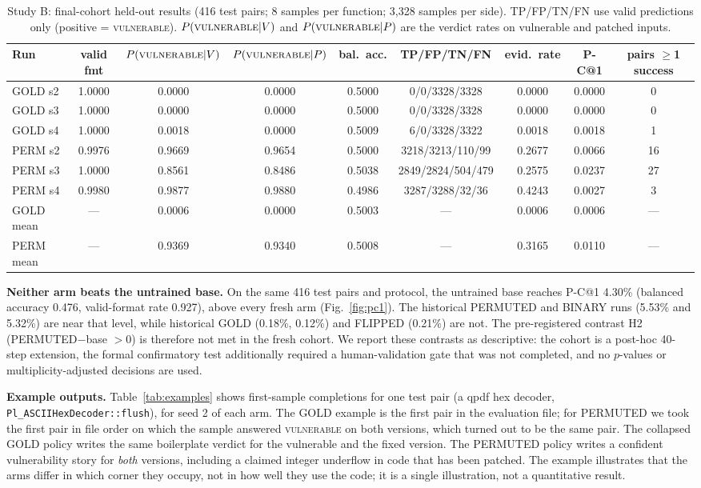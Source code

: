 \documentclass[journal]{IEEEtran}
\makeatletter
\newcommand{\vuln}{\textsc{vulnerable}}
\newcommand{\pc}{P-C@1}
\makeatother
\begin{document}
\begin{table}[t]
\centering\footnotesize\setlength{\tabcolsep}{4pt}
\caption{Study B: final-cohort held-out results (416 test pairs; 8 samples per function; 3,328 samples per side). TP/FP/TN/FN use valid predictions only (positive = \vuln{}). $P(\vuln|V)$ and $P(\vuln|P)$ are the verdict rates on vulnerable and patched inputs.}
\label{tab:cohort}
\begin{tabular}{lcccccccc}
\toprule
Run & valid fmt & $P(\vuln|V)$ & $P(\vuln|P)$ & bal.\ acc. & TP/FP/TN/FN & evid.\ rate & \pc{} & pairs $\ge$1 success\\
\midrule
GOLD s2 & 1.0000 & 0.0000 & 0.0000 & 0.5000 & 0/0/3328/3328 & 0.0000 & 0.0000 & 0\\
GOLD s3 & 1.0000 & 0.0000 & 0.0000 & 0.5000 & 0/0/3328/3328 & 0.0000 & 0.0000 & 0\\
GOLD s4 & 1.0000 & 0.0018 & 0.0000 & 0.5009 & 6/0/3328/3322 & 0.0018 & 0.0018 & 1\\
PERM s2 & 0.9976 & 0.9669 & 0.9654 & 0.5000 & 3218/3213/110/99 & 0.2677 & 0.0066 & 16\\
PERM s3 & 1.0000 & 0.8561 & 0.8486 & 0.5038 & 2849/2824/504/479 & 0.2575 & 0.0237 & 27\\
PERM s4 & 0.9980 & 0.9877 & 0.9880 & 0.4986 & 3287/3288/32/36 & 0.4243 & 0.0027 & 3\\
\midrule
GOLD mean & --- & 0.0006 & 0.0000 & 0.5003 & --- & 0.0006 & 0.0006 & ---\\
PERM mean & --- & 0.9369 & 0.9340 & 0.5008 & --- & 0.3165 & 0.0110 & ---\\
\bottomrule
\end{tabular}
\end{table}

\textbf{Neither arm beats the untrained base.} On the same 416 test pairs and protocol, the untrained base reaches \pc{} 4.30\% (balanced accuracy 0.476, valid-format rate 0.927), above every fresh arm (Fig.~\ref{fig:pc1}). The historical PERMUTED and BINARY runs (5.53\% and 5.32\%) are near that level, while historical GOLD (0.18\%, 0.12\%) and FLIPPED (0.21\%) are not. The pre-registered contrast H2 (PERMUTED$-$base $>0$) is therefore not met in the fresh cohort. We report these contrasts as descriptive: the cohort is a post-hoc 40-step extension, the formal confirmatory test additionally required a human-validation gate that was not completed, and no $p$-values or multiplicity-adjusted decisions are used.

\textbf{Example outputs.} Table~\ref{tab:examples} shows first-sample completions for one test pair (a qpdf hex decoder, \texttt{Pl\_ASCIIHexDecoder::flush}), for seed 2 of each arm. The GOLD example is the first pair in the evaluation file; for PERMUTED we took the first pair in file order on which the sample answered \vuln{} on both versions, which turned out to be the same pair. The collapsed GOLD policy writes the same boilerplate verdict for the vulnerable and the fixed version. The PERMUTED policy writes a confident vulnerability story for \emph{both} versions, including a claimed integer underflow in code that has been patched. The example illustrates that the arms differ in which corner they occupy, not in how well they use the code; it is a single illustration, not a quantitative result.
\end{document}
